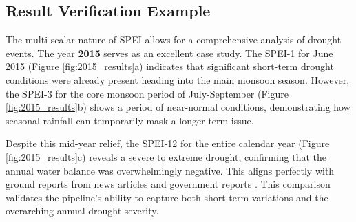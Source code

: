 \documentclass[12pt, a4paper]{article}
\begin{document}
\subsection{Result Verification Example}
The multi-scalar nature of SPEI allows for a comprehensive analysis of drought events. The year \textbf{2015} serves as an excellent case study. The SPEI-1 for June 2015 (Figure \ref{fig:2015_results}a) indicates that significant short-term drought conditions were already present heading into the main monsoon season. However, the SPEI-3 for the core monsoon period of July-September (Figure \ref{fig:2015_results}b) shows a period of near-normal conditions, demonstrating how seasonal rainfall can temporarily mask a longer-term issue.

Despite this mid-year relief, the SPEI-12 for the entire calendar year (Figure \ref{fig:2015_results}c) reveals a severe to extreme drought, confirming that the annual water balance was overwhelmingly negative. This aligns perfectly with ground reports from news articles \cite{sandrp2015} and government reports \cite{dpd2015}. This comparison validates the pipeline's ability to capture both short-term variations and the overarching annual drought severity.
\end{document}
